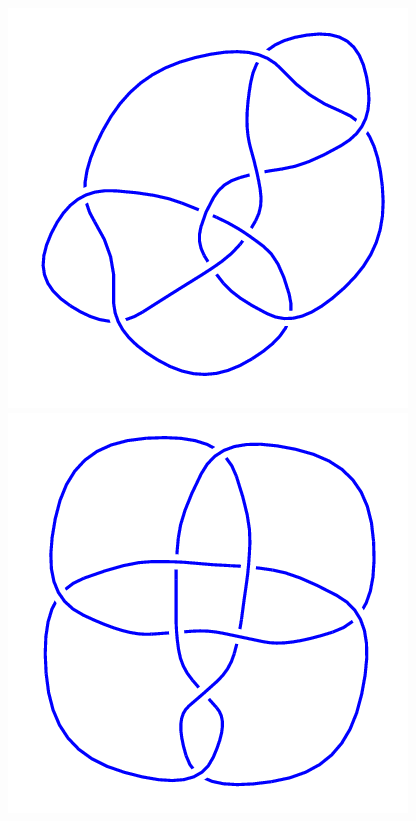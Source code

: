 \begin{figure}[H]
\begin{minipage}[b]{.18\linewidth}
	\end{minipage}
	\begin{minipage}[b]{.18\linewidth}
		\centering
		\includegraphics[width=\linewidth]{../data/9_33.png}
	\end{minipage}
	\begin{minipage}[b]{.18\linewidth}
		\centering
		\includegraphics[width=\linewidth]{../data/9_34.png}

\end{minipage}
\end{figure}

